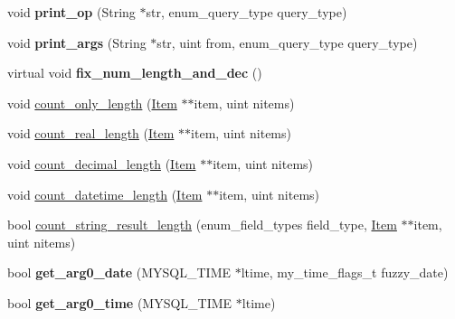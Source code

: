 \begin{DoxyCompactItemize}
\item 
\mbox{\label{classItem__func_a0f25cc39b889319e0512446dc39b10d2}} 
void {\bfseries print\+\_\+op} (String $\ast$str, enum\+\_\+query\+\_\+type query\+\_\+type)
\item 
\mbox{\label{classItem__func_a687ef180fd799d38acc3c6011b2f6f15}} 
void {\bfseries print\+\_\+args} (String $\ast$str, uint from, enum\+\_\+query\+\_\+type query\+\_\+type)
\item 
\mbox{\label{classItem__func_ac6d7eca2bc3169e3292eb5087981125d}} 
virtual void {\bfseries fix\+\_\+num\+\_\+length\+\_\+and\+\_\+dec} ()
\item 
void \mbox{\hyperlink{classItem__func_a8d850c74056662d3bb11bbb43dcacab0}{count\+\_\+only\+\_\+length}} (\mbox{\hyperlink{classItem}{Item}} $\ast$$\ast$item, uint nitems)
\item 
void \mbox{\hyperlink{classItem__func_a76b738e84b242f2bebcca16d69bae60a}{count\+\_\+real\+\_\+length}} (\mbox{\hyperlink{classItem}{Item}} $\ast$$\ast$item, uint nitems)
\item 
void \mbox{\hyperlink{classItem__func_a5fde81bfb85905be33465d41ff178fa0}{count\+\_\+decimal\+\_\+length}} (\mbox{\hyperlink{classItem}{Item}} $\ast$$\ast$item, uint nitems)
\item 
void \mbox{\hyperlink{classItem__func_a3380dac8e8c760d72db5efeaa1c59d58}{count\+\_\+datetime\+\_\+length}} (\mbox{\hyperlink{classItem}{Item}} $\ast$$\ast$item, uint nitems)
\item 
bool \mbox{\hyperlink{classItem__func_a1ae5c3d14e9920407d536a8ce660b7fb}{count\+\_\+string\+\_\+result\+\_\+length}} (enum\+\_\+field\+\_\+types field\+\_\+type, \mbox{\hyperlink{classItem}{Item}} $\ast$$\ast$item, uint nitems)
\item 
\mbox{\label{classItem__func_a8a3774fc9f5306242e5132fd4ab43320}} 
bool {\bfseries get\+\_\+arg0\+\_\+date} (M\+Y\+S\+Q\+L\+\_\+\+T\+I\+ME $\ast$ltime, my\+\_\+time\+\_\+flags\+\_\+t fuzzy\+\_\+date)
\item 
\mbox{\label{classItem__func_ad95d1ca0b98215a9e41c034d5148d013}} 
bool {\bfseries get\+\_\+arg0\+\_\+time} (M\+Y\+S\+Q\+L\+\_\+\+T\+I\+ME $\ast$ltime)
\item 
\mbox{\label{classItem__func_a729f8348829cffeddd0b30b0ce5fb2b7}} 
$$
\end{DoxyCompactItemize}
